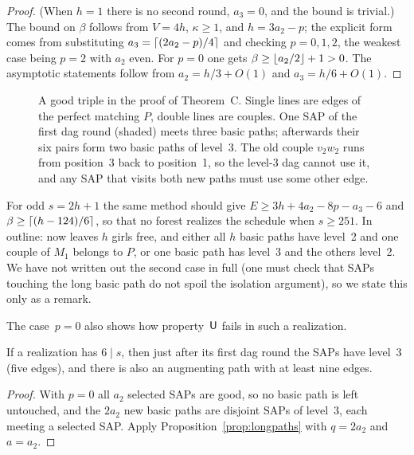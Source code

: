 \begin{proof}
(When $h=1$ there is no second round, $a_3=0$, and the bound is trivial.)
The bound on $\beta$ follows from $V=4h$, $\kappa\ge1$, and $h=3a_2-p$; the
explicit form comes from substituting $a_3=\lceil(2a_2-p)/4\rceil$ and checking
$p=0,1,2$, the weakest case being $p=2$ with $a_2$ even. For $p=0$ one gets
$\beta\ge\lfloor a_2/2\rfloor+1>0$. The asymptotic statements follow from
$a_2=h/3+O(1)$ and $a_3=h/6+O(1)$.
\end{proof}

\begin{figure}[ht]
\centering

\caption{A good triple in the proof of Theorem~C. Single lines are edges of
the perfect matching $P$, double lines are couples. One SAP of the first
dag round (shaded) meets three basic paths; afterwards their six pairs form
two basic paths of level~3. The old couple $v_2w_2$ runs from position~3
back to position~1, so the level-3 dag cannot use it, and any SAP that
visits both new paths must use some other edge.}
\label{fig:goodtriple}
\end{figure}

\begin{remark}
For odd $s=2h+1$ the same method should give
$E\ge3h+4a_2-8p-a_3-6$ and $\beta\ge\lceil(h-124)/6\rceil$, so that no forest
realizes the schedule when $s\ge251$. In outline:  now leaves $h$ girls
free, and either all $h$ basic paths have level~2 and one couple of $M_1$
belongs to $P$, or one basic path has level~3 and the others level~2. We
have not written out the second case in full (one must check that SAPs
touching the long basic path do not spoil the isolation argument), so we
state this only as a remark.
\end{remark}

The case~$p=0$ also shows how property~$\mathsf U$ fails in such a realization.

\begin{corollary}
If a realization has $6\mid s$, then just after its first dag round the
SAPs have level~3 (five edges), and there is also an augmenting path with
at least nine edges.
\end{corollary}

\begin{proof}
With $p=0$ all $a_2$ selected SAPs are good, so no basic path is left
untouched, and the $2a_2$ new basic paths are disjoint SAPs of level~3,
each meeting a selected SAP. Apply Proposition~\ref{prop:longpaths} with
$q=2a_2$ and $a=a_2$.
\end{proof}

